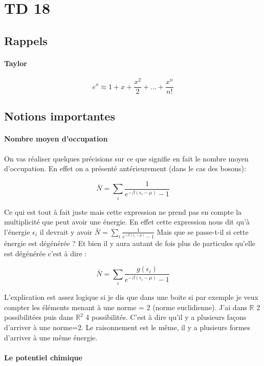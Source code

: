 \section{TD 18}



\subsection{Rappels}


\paragraph{Taylor}

\[
	e^x\approx 1+x+\frac{x^2}{2}+...+\frac{x^n}{n!}
\]


\subsection{Notions importantes}


\paragraph{Nombre moyen d'occupation}

On vas réaliser quelques précisions sur ce que signifie en fait le nombre moyen d'occupation. En effet on a présenté antérieurement (dans le cas des bosons): 

\[
	\bar{N}=\sum_i \frac{1}{e^{-\beta (\epsilon_i-\mu)}-1}
\]

Ce qui est tout à fait juste mais cette expression ne prend pas en compte la multiplicité que peut avoir une énergie. En effet cette expression nous dit qu'à l'énergie $\epsilon_i$ il devrait y avoir $\bar{N}=\sum_i \frac{1}{e^{-\beta (\epsilon_i-\mu)}-1}$
Mais que se passe-t-il si cette énergie est dégénérée ? Et bien il y aura autant de fois plus de particules qu'elle est dégénérée c'est à dire :

\[
	\bar{N}=\sum_i \frac{g(\epsilon_i)}{e^{-\beta (\epsilon_i-\mu)}-1}
\]

L'explication est assez logique si je dis que dans une boite si par exemple je veux compter les éléments menant à une norme = 2 (norme euclidienne). J'ai dans $\mathbb{R}$ 2 possibilitées puis dans $\mathbb{R}^2$ 4 possibilités. C'est à dire qu'il y a plusieurs façons d'arriver à une norme=2. Le raisonnement est le même, il y a plusieurs formes d'arriver à une même énergie.

\paragraph{Le potentiel chimique}

